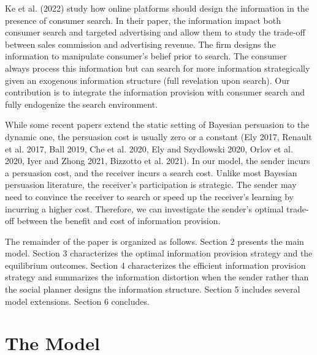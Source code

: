 \documentclass[11pt]{extarticle}
\begin{document}
Ke et al. (2022) study how online platforms should design the information in the presence of consumer search. In their paper, the information impact both consumer search and targeted advertising and allow them to study the trade-off between sales commission and advertising revenue. The firm designs the information to manipulate consumer's belief prior to search. The consumer always process this information but can search for more information strategically given an exogenous information structure (full revelation upon search). Our contribution is to integrate the information provision with consumer search and fully endogenize the search environment. 

While some recent papers extend the static setting of Bayesian persuasion to the dynamic one, the persuasion cost is usually zero or a constant (Ely 2017, Renault et al. 2017, Ball 2019, Che et al. 2020, Ely and Szydlowski 2020, Orlov et al. 2020, Iyer and Zhong 2021, Bizzotto et al. 2021). In our model, the sender incurs a persuasion cost, and the receiver incurs a search cost. Unlike most Bayesian persuasion literature, the receiver's participation is strategic. The sender may need to convince the receiver to search or speed up the receiver's learning by incurring a higher cost. Therefore, we can investigate the sender's optimal trade-off between the benefit and cost of information provision.


The remainder of the paper is organized as follows. Section 2 presents the main model. Section 3 characterizes the optimal information provision strategy and the equilibrium outcomes. Section 4 characterizes the efficient information provision strategy and summarizes the information distortion when the sender rather than the social planner designs the information structure. Section 5 includes several model extensions. Section 6 concludes.


\section{The Model}
\end{document}
